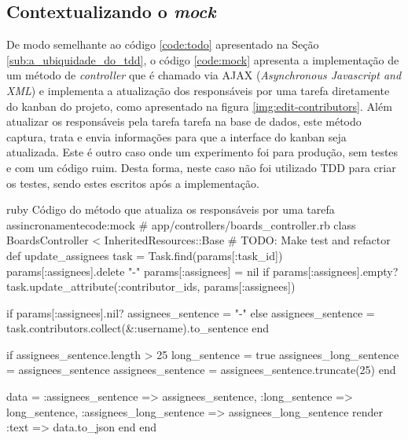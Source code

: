 \subsection{Contextualizando o \textit{mock}}
\label{sub:contextualizando_o_mock}

De modo semelhante ao código \ref{code:todo} apresentado na Seção \ref{sub:a_ubiquidade_do_tdd}, o código \ref{code:mock} apresenta a implementação de um método de \textit{controller} que é chamado via AJAX (\textit{Asynchronous Javascript and XML}) e implementa a atualização dos responsáveis por uma tarefa diretamente do kanban do projeto, como apresentado na figura \ref{img:edit-contributors}. Além atualizar os responsáveis pela tarefa tarefa na base de dados, este método captura, trata e envia informações para que a interface do kanban seja atualizada. Este é outro caso onde um experimento foi para produção, sem testes e com um código ruim. Desta forma, neste caso não foi utilizado TDD para criar os testes, sendo estes escritos após a implementação.

\begin{mycode}{ruby}%
{Código do método que atualiza os responsáveis por uma tarefa assincronamente}{code:mock}
# app/controllers/boards_controller.rb
class BoardsController < InheritedResources::Base
  # TODO: Make test and refactor
  def update_assignees
    task = Task.find(params[:task_id])
    params[:assignees].delete "-"
    params[:assignees] = nil if params[:assignees].empty?
    task.update_attribute(:contributor_ids, params[:assignees])

    if params[:assignees].nil?
      assignees_sentence = "-"
    else
      assignees_sentence = task.contributors.collect(&:username).to_sentence
    end

    if assignees_sentence.length > 25
      long_sentence = true
      assignees_long_sentence = assignees_sentence
      assignees_sentence = assignees_sentence.truncate(25)
    end

    data = { :assignees_sentence => assignees_sentence,
             :long_sentence => long_sentence,
             :assignees_long_sentence => assignees_long_sentence }
    render :text => data.to_json
  end
end
\end{mycode}


